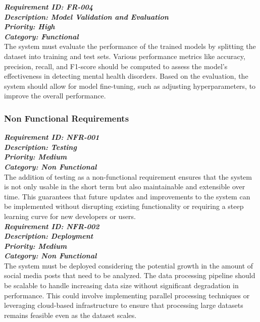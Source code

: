 \noindent
\textbf{\emph{Requirement ID: FR-004}} \\ 
\textbf{\emph{Description: Model Validation and Evaluation}} \\
\textbf{\emph{Priority: High}} \\
\textbf{\emph{Category: Functional}} \\
\noindent
The system must evaluate the performance of the trained models by splitting the dataset into training and test sets. Various performance metrics like accuracy, precision, recall, and F1-score should be computed to assess the model’s effectiveness in detecting mental health disorders. Based on the evaluation, the system should allow for model fine-tuning, such as adjusting hyperparameters, to improve the overall performance. 


\subsubsection{Non Functional Requirements}

\noindent
\textbf{\emph{Requirement ID: NFR-001}} \\ 
\textbf{\emph{Description: Testing}} \\
\textbf{\emph{Priority: Medium}} \\
\textbf{\emph{Category: Non Functional}} \\
\noindent
The addition of testing as a non-functional requirement ensures that the system is not only usable in the short term but also maintainable and extensible over time. This guarantees that future updates and improvements to the system can be implemented without disrupting existing functionality or requiring a steep learning curve for new developers or users. \\

\noindent
\textbf{\emph{Requirement ID: NFR-002}} \\ 
\textbf{\emph{Description:  Deployment}} \\
\textbf{\emph{Priority: Medium}} \\
\textbf{\emph{Category: Non Functional}} \\
\noindent
The system must be deployed considering the potential growth in the amount of social media posts that need to be analyzed. The data processing pipeline should be scalable to handle increasing data size without significant degradation in performance. This could involve implementing parallel processing techniques or leveraging cloud-based infrastructure to ensure that processing large datasets remains feasible even as the dataset scales. 

